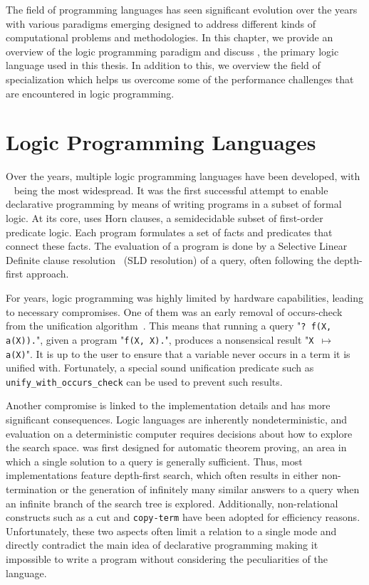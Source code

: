 \documentclass[crop=false]{standalone}
\begin{document}
The field of programming languages has seen significant evolution over the years with various paradigms emerging designed to address different kinds of computational problems and methodologies. 
In this chapter, we provide an overview of the logic programming paradigm and discuss \mk, the primary logic language used in this thesis. 
In addition to this, we overview the field of specialization which helps us overcome some of the performance challenges that are encountered in logic programming. 


\section{Logic Programming Languages}

Over the years, multiple logic programming languages have been developed, with \prolog~\cite{battani1973interpreteur} being the most widespread. 
It was the first successful attempt to enable declarative programming by means of writing programs in a subset of formal logic.
At its core, \prolog uses Horn clauses, a semidecidable subset of first-order predicate logic. 
Each program formulates a set of facts and predicates that connect these facts. 
The evaluation of a program is done by a Selective Linear Definite clause resolution~\cite{robinson1965machine} (SLD resolution) of a query, often following the depth-first approach.  

For years, logic programming was highly limited by hardware capabilities, leading to necessary compromises. 
One of them was an early removal of occurs-check from the unification algorithm~\cite{cohen1988view}. 
This means that running a query "\texttt{? f(X, a(X)).}", given a program "\texttt{f(X, X).}", produces a nonsensical result "\texttt{X $\mapsto$ a(X)}". 
It is up to the user to ensure that a variable never occurs in a term it is unified with. 
Fortunately, a special sound unification predicate such as \texttt{unify\_with\_occurs\_check} can be used to prevent such results. 

Another compromise is linked to the implementation details and has more significant consequences. 
Logic languages are inherently nondeterministic, and evaluation on a deterministic computer requires decisions about how to explore the search space. 
\prolog was first designed for automatic theorem proving, an area in which a single solution to a query is generally sufficient. 
Thus, most \prolog implementations feature depth-first search, which often results in either non-termination or the generation of infinitely many similar answers to a query when an infinite branch of the search tree is explored. 
Additionally, non-relational constructs such as a cut and \texttt{copy-term} have been adopted for efficiency reasons. 
Unfortunately, these two aspects often limit a relation to a single mode and directly contradict the main idea of declarative programming making it impossible to write a program without considering the peculiarities of the language. 
\end{document}

